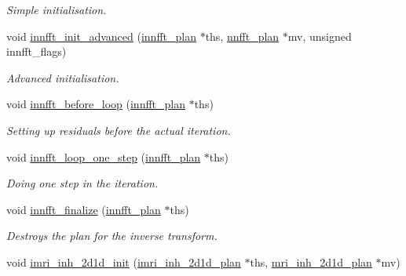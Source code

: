 \begin{CompactItemize}
\begin{CompactList}\small\item\em Simple initialisation. \item\end{CompactList}\item 
\hypertarget{group__solver_ga16}{
void \hyperlink{group__solver_ga16}{innfft\_\-init\_\-advanced} (\hyperlink{structinnfft__plan}{innfft\_\-plan} $\ast$ths, \hyperlink{structnnfft__plan}{nnfft\_\-plan} $\ast$mv, unsigned innfft\_\-flags)}
\label{group__solver_ga16}

\begin{CompactList}\small\item\em Advanced initialisation. \item\end{CompactList}\item 
\hypertarget{group__solver_ga17}{
void \hyperlink{group__solver_ga17}{innfft\_\-before\_\-loop} (\hyperlink{structinnfft__plan}{innfft\_\-plan} $\ast$ths)}
\label{group__solver_ga17}

\begin{CompactList}\small\item\em Setting up residuals before the actual iteration. \item\end{CompactList}\item 
\hypertarget{group__solver_ga18}{
void \hyperlink{group__solver_ga18}{innfft\_\-loop\_\-one\_\-step} (\hyperlink{structinnfft__plan}{innfft\_\-plan} $\ast$ths)}
\label{group__solver_ga18}

\begin{CompactList}\small\item\em Doing one step in the iteration. \item\end{CompactList}\item 
\hypertarget{group__solver_ga19}{
void \hyperlink{group__solver_ga19}{innfft\_\-finalize} (\hyperlink{structinnfft__plan}{innfft\_\-plan} $\ast$ths)}
\label{group__solver_ga19}

\begin{CompactList}\small\item\em Destroys the plan for the inverse transform. \item\end{CompactList}\item 
\hypertarget{group__solver_ga20}{
void \hyperlink{group__solver_ga20}{imri\_\-inh\_\-2d1d\_\-init} (\hyperlink{structimri__inh__2d1d__plan}{imri\_\-inh\_\-2d1d\_\-plan} $\ast$ths, \hyperlink{structmri__inh__2d1d__plan}{mri\_\-inh\_\-2d1d\_\-plan} $\ast$mv)}
\label{group__solver_ga20}


\end{CompactItemize}
